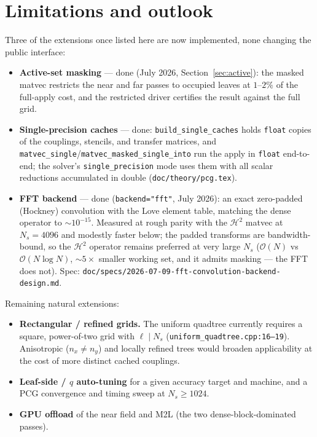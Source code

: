 \documentclass[11pt,a4paper]{article}
\newcommand{\Order}{\mathcal{O}}
\newcommand{\Htwo}{\mathcal{H}^2}
\newcommand{\code}[1]{\texttt{#1}}
\theoremstyle{definition}
\theoremstyle{remark}
\begin{document}
\section{Limitations and outlook}
\label{sec:outlook}

Three of the extensions once listed here are now implemented, none changing
the public interface:
\begin{itemize}
\item \textbf{Active-set masking} --- done (July 2026,
Section~\ref{sec:active}): the masked matvec restricts the near and far
passes to occupied leaves at $1$--$2\%$ of the full-apply cost, and the
restricted driver certifies the result against the full grid.
\item \textbf{Single-precision caches} --- done: \code{build\_single\_caches}
holds \code{float} copies of the couplings, stencils, and transfer matrices,
and \code{matvec\_single}/\code{matvec\_masked\_single\_into} run the apply
in \code{float} end-to-end; the solver's \code{single\_precision} mode uses
them with all scalar reductions accumulated in double
(\code{doc/theory/pcg.tex}).
\item \textbf{FFT backend} --- done (\code{backend="fft"}, July 2026): an
exact zero-padded (Hockney) convolution with the Love element table,
matching the dense operator to ${\sim}10^{-15}$. Measured at rough parity
with the $\Htwo$ matvec at $N_s=4096$ and modestly faster below; the padded
transforms are bandwidth-bound, so the $\Htwo$ operator remains preferred at
very large $N_s$ ($\Order(N)$ vs $\Order(N\log N)$, ${\sim}5\times$ smaller
working set, and it admits masking --- the FFT does not). Spec:
\code{doc/specs/2026-07-09-fft-convolution-backend-design.md}.
\end{itemize}
Remaining natural extensions:
\begin{itemize}
\item \textbf{Rectangular / refined grids.} The uniform quadtree currently
requires a square, power-of-two grid with $\ell\mid N_s$
(\code{uniform\_quadtree.cpp:16--19}). Anisotropic ($n_x\ne n_y$) and locally
refined trees would broaden applicability at the cost of more distinct cached
couplings.
\item \textbf{Leaf-side / $q$ auto-tuning} for a given accuracy target and
machine, and a PCG convergence and timing sweep at $N_s\ge1024$.
\item \textbf{GPU offload} of the near field and M2L (the two
dense-block-dominated passes).
\end{itemize}
\end{document}
